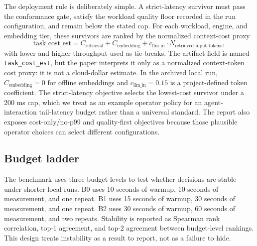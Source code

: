 The deployment rule is deliberately simple. A strict-latency survivor must pass the conformance gate, satisfy the workload quality floor recorded in the run configuration, and remain below the stated \maxrowp cap. For each workload, engine, and embedding tier, these survivors are ranked by the normalized context-cost proxy
\[
\mathrm{task\_cost\_est}=C_{\mathrm{retrieval}}+C_{\mathrm{embedding}}+c_{\mathrm{llm\_in}}\cdot N_{\mathrm{retrieved\_input\_tokens}},
\]
with lower \maxrowp and higher throughput used as tie-breaks. The artifact field is named \texttt{task\_cost\_est}, but the paper interprets it only as a normalized context-token cost proxy: it is not a cloud-dollar estimate. In the archived local run, \(C_{\mathrm{embedding}}=0\) for offline embeddings and \(c_{\mathrm{llm\_in}}=0.15\) is a project-defined token coefficient. The strict-latency objective selects the lowest-cost survivor under a 200 ms \maxrowp cap, which we treat as an example operator policy for an agent-interaction tail-latency budget rather than a universal standard. The report also exposes cost-only/no-p99 and quality-first objectives because those plausible operator choices can select different configurations.

\begin{center}
\end{center}

\subsection{Budget ladder}

The benchmark uses three budget levels to test whether decisions are stable under shorter local runs. B0 uses 10 seconds of warmup, 10 seconds of measurement, and one repeat. B1 uses 15 seconds of warmup, 30 seconds of measurement, and one repeat. B2 uses 30 seconds of warmup, 60 seconds of measurement, and two repeats. Stability is reported as Spearman rank correlation, top-1 agreement, and top-2 agreement between budget-level rankings. This design treats instability as a result to report, not as a failure to hide.
